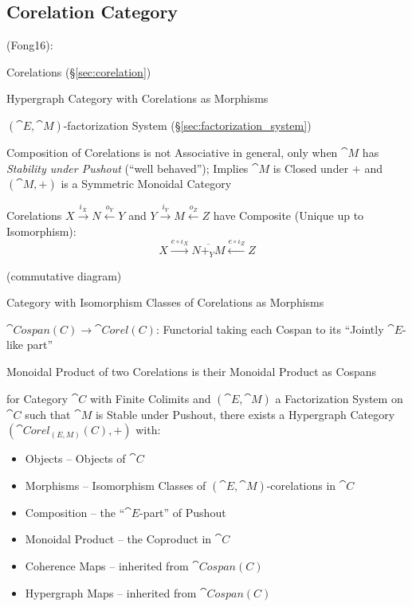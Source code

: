 \subsection{Corelation Category}\label{sec:corelation_category}

(Fong16):

Corelations (\S\ref{sec:corelation})

Hypergraph Category with Corelations as Morphisms

$(\cat{E},\cat{M})$-factorization System
(\S\ref{sec:factorization_system})

Composition of Corelations is not Associative in general, only when
$\cat{M}$ has \emph{Stability under Pushout} (``well behaved'');
Implies $\cat{M}$ is Closed under $+$ and $(\cat{M},+)$ is a Symmetric
Monoidal Category

Corelations $X \xrightarrow{i_X} N \xleftarrow{o_Y} Y$ and $Y
\xrightarrow{i_Y} M \xleftarrow{o_Z} Z$ have Composite (Unique up to
Isomorphism):
\[
  X \xrightarrow{e\circ\iota_X} \overline{N +_Y M}
    \xleftarrow{e\circ\iota_Z} Z
\]

(commutative diagram) %

Category with Isomorphism Classes of Corelations as Morphisms

$\cat{Cospan(C)} \rightarrow \cat{Corel(C)}$: Functorial taking each
Cospan to its ``Jointly $\cat{E}$-like part''

Monoidal Product of two Corelations is their Monoidal Product as
Cospans

for Category $\cat{C}$ with Finite Colimits and $(\cat{E},\cat{M})$ a
Factorization System on $\cat{C}$ such that $\cat{M}$ is Stable under
Pushout, there exists a Hypergraph Category $(\cat{Corel_{(E,M)}(C)},
+)$ with:
\begin{itemize}
  \item Objects -- Objects of $\cat{C}$
  \item Morphisms -- Isomorphism Classes of
    $(\cat{E},\cat{M})$-corelations in $\cat{C}$
  \item Composition -- the ``$\cat{E}$-part'' of Pushout %
  \item Monoidal Product -- the Coproduct in $\cat{C}$
  \item Coherence Maps -- inherited from $\cat{Cospan(C)}$
  \item Hypergraph Maps -- inherited from $\cat{Cospan(C)}$
\end{itemize}


